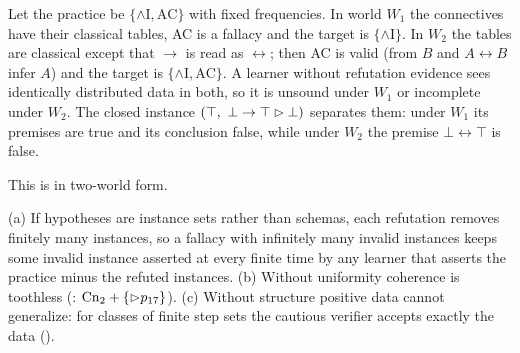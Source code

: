 \begin{proposition}\label{prop:twotier:negative}
Let the practice be $\{\wedge\mathrm I,\mathrm{AC}\}$ with fixed frequencies. In world $W_1$ the connectives have their classical tables, AC is a fallacy and the target is $\{\wedge\mathrm I\}$. In $W_2$ the tables are classical except that $\to$ is read as $\leftrightarrow$; then AC is valid (from $B$ and $A\leftrightarrow B$ infer $A$) and the target is $\{\wedge\mathrm I,\mathrm{AC}\}$. A learner without refutation evidence sees identically distributed data in both, so it is unsound under $W_1$ or incomplete under $W_2$. The closed instance $(\top,\ \bot\to\top\step\bot)$ separates them: under $W_1$ its premises are true and its conclusion false, while under $W_2$ the premise $\bot\leftrightarrow\top$ is false.
\end{proposition}

This is  in two-world form.

\begin{proposition}\label{prop:twotier:structurality}
\textup{(a)} If hypotheses are instance sets rather than schemas, each refutation removes finitely many instances, so a fallacy with infinitely many invalid instances keeps some invalid instance asserted at every finite time by any learner that asserts the practice minus the refuted instances.
\textup{(b)} Without uniformity coherence is toothless (: $\mathrm{Cn}_2+\{\rhd p_{17}\}$).
\textup{(c)} Without structure positive data cannot generalize: for classes of finite step sets the cautious verifier accepts exactly the data ().
\end{proposition}

